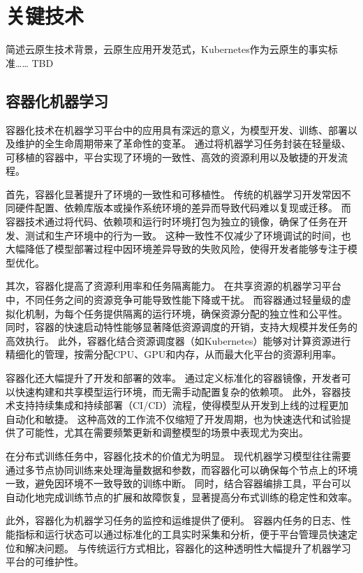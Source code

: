 
\chapter{关键技术}

简述云原生技术背景，云原生应用开发范式，Kubernetes作为云原生的事实标准……
TBD


\section{容器化机器学习}

容器化技术在机器学习平台中的应用具有深远的意义，为模型开发、训练、部署以及维护的全生命周期带来了革命性的变革。
通过将机器学习任务封装在轻量级、可移植的容器中，平台实现了环境的一致性、高效的资源利用以及敏捷的开发流程。

首先，容器化显著提升了环境的一致性和可移植性。
传统的机器学习开发常因不同硬件配置、依赖库版本或操作系统环境的差异而导致代码难以复现或迁移。
而容器技术通过将代码、依赖项和运行时环境打包为独立的镜像，确保了任务在开发、测试和生产环境中的行为一致。
这种一致性不仅减少了环境调试的时间，也大幅降低了模型部署过程中因环境差异导致的失败风险，使得开发者能够专注于模型优化。

其次，容器化提高了资源利用率和任务隔离能力。
在共享资源的机器学习平台中，不同任务之间的资源竞争可能导致性能下降或干扰。
而容器通过轻量级的虚拟化机制，为每个任务提供隔离的运行环境，确保资源分配的独立性和公平性。
同时，容器的快速启动特性能够显著降低资源调度的开销，支持大规模并发任务的高效执行。
此外，容器化结合资源调度器（如Kubernetes）能够对计算资源进行精细化的管理，按需分配CPU、GPU和内存，从而最大化平台的资源利用率。

容器化还大幅提升了开发和部署的效率。
通过定义标准化的容器镜像，开发者可以快速构建和共享模型运行环境，而无需手动配置复杂的依赖项。
此外，容器技术支持持续集成和持续部署（CI/CD）流程，使得模型从开发到上线的过程更加自动化和敏捷。
这种高效的工作流不仅缩短了开发周期，也为快速迭代和试验提供了可能性，尤其在需要频繁更新和调整模型的场景中表现尤为突出。

在分布式训练任务中，容器化技术的价值尤为明显。
现代机器学习模型往往需要通过多节点协同训练来处理海量数据和参数，而容器化可以确保每个节点上的环境一致，避免因环境不一致导致的训练中断。
同时，结合容器编排工具，平台可以自动化地完成训练节点的扩展和故障恢复，显著提高分布式训练的稳定性和效率。

此外，容器化为机器学习任务的监控和运维提供了便利。
容器内任务的日志、性能指标和运行状态可以通过标准化的工具实时采集和分析，便于平台管理员快速定位和解决问题。
与传统运行方式相比，容器化的这种透明性大幅提升了机器学习平台的可维护性。

